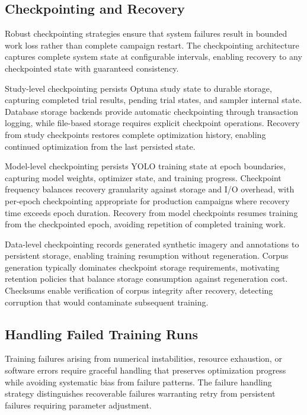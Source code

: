 \subsection{Checkpointing and Recovery}

Robust checkpointing strategies ensure that system failures result in bounded work loss rather than complete campaign restart. The checkpointing architecture captures complete system state at configurable intervals, enabling recovery to any checkpointed state with guaranteed consistency.

Study-level checkpointing persists Optuna study state to durable storage, capturing completed trial results, pending trial states, and sampler internal state. Database storage backends provide automatic checkpointing through transaction logging, while file-based storage requires explicit checkpoint operations. Recovery from study checkpoints restores complete optimization history, enabling continued optimization from the last persisted state.

Model-level checkpointing persists YOLO training state at epoch boundaries, capturing model weights, optimizer state, and training progress. Checkpoint frequency balances recovery granularity against storage and I/O overhead, with per-epoch checkpointing appropriate for production campaigns where recovery time exceeds epoch duration. Recovery from model checkpoints resumes training from the checkpointed epoch, avoiding repetition of completed training work.

Data-level checkpointing records generated synthetic imagery and annotations to persistent storage, enabling training resumption without regeneration. Corpus generation typically dominates checkpoint storage requirements, motivating retention policies that balance storage consumption against regeneration cost. Checksums enable verification of corpus integrity after recovery, detecting corruption that would contaminate subsequent training.

\subsection{Handling Failed Training Runs}

Training failures arising from numerical instabilities, resource exhaustion, or software errors require graceful handling that preserves optimization progress while avoiding systematic bias from failure patterns. The failure handling strategy distinguishes recoverable failures warranting retry from persistent failures requiring parameter adjustment.

